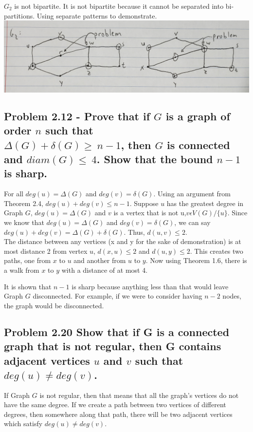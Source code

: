 \documentclass[10pt,a4paper]{article}
\begin{document}
$G_{2}$ is not bipartite. It is not bipartite because it cannot be separated into bi-partitions. Using separate patterns to demonstrate.\\
\includegraphics[width=15cm]{answerg2}

\subsection*{Problem 2.12 - Prove that if $G$ is a graph of order $n$ such that \\$\Delta (G) + \delta (G) \geq\ n - 1$, then $G$ is connected and $diam(G) \leq\ 4$. Show that the bound $n - 1$ is sharp.
}

For all $deg(u) = \Delta(G)$ and $deg(v) = \delta(G)$. Using an argument from Theorem 2.4, $deg(u) + deg(v) \leq n - 1$.
Suppose $u$ has the greatest degree in Graph $G$, $deg(u) = \Delta(G)$ and $v$ is a vertex that is not u,$v \epsilon V(G) / \{u\}$. Since we know that $deg(u) = \Delta(G)$ and $deg(v) = \delta(G)$, we can say $deg(u) + deg(v) = \Delta(G) + \delta(G)$. Thus, $d(u, v) \leq 2$.\\
The distance between any vertices (x and y for the sake of demonstration) is at most distance 2 from vertex $u$, 
$d(x, u) \leq 2$ and $d(u, y) \leq 2$. This creates two paths, one from $x$ to $u$ and another from $u$ to $y$. Now using Theorem 1.6, there is a walk from $x$ to $y$ with a distance of at most 4. 

It is shown that $n-1$ is sharp because anything less than that would leave Graph $G$ disconnected. For example, if we were to consider having $n-2$ nodes, the graph would be disconnected. 

\subsection*{Problem 2.20 Show that if G is a connected graph that is not regular, then G contains adjacent vertices $u$ and $v$ such that $deg(u) \ne deg(v)$.
}

If Graph $G$ is not regular, then that means that all the graph's vertices do not have the same degree. If we create a path between two vertices of different degrees, then somewhere along that path, there will be two adjacent vertices which satisfy $deg(u) \ne deg(v)$.
\end{document}
